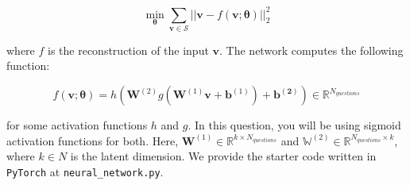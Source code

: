 \documentclass[11pt]{article}
\begin{document}
\[
    \min_{\boldsymbol{\theta}}\sum_{\mathbf{v} \in \mathcal{S}}||\mathbf{v} - f(\mathbf{v}; \boldsymbol{\theta})||_2^2
\]

where $f$ is the reconstruction of the input $\mathbf{v}$. The network computes the following function:

\[
    f(\mathbf{v};\boldsymbol{\theta}) = h(\mathbf{W}^{(2)}g(\mathbf{W}^{(1)}\mathbf{v} + \mathbf{b}^{(1)}) + \mathbf{b^{(2)}}) \in \mathbb{R}^{N_{questions}}
\]

for some activation functions $h$ and $g$. In this question, you will be using sigmoid activation functions for both. Here, $\mathbf{W}^{(1)} \in \mathbb{R}^{k \times N_{questions}}$ and $\mathbb{W}^{(2)} \in \mathbb{R}^{N_{questions} \times k}$, where $k \in N$ is the latent dimension. We provide the starter code written in \verb|PyTorch| at \verb|neural_network.py|.
\end{document}
